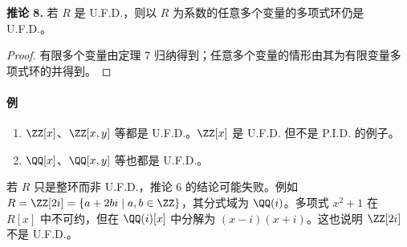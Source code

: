 \noindent\textbf{推论 8.} 若 $R$ 是 U.F.D.，则以 $R$ 为系数的任意多个变量的多项式环仍是 U.F.D.。

\begin{proof}
	有限多个变量由定理 7 归纳得到；任意多个变量的情形由其为有限变量多项式环的并得到。
\end{proof}

\paragraph{例}
\begin{enumerate}[label=(\arabic*)]
	\item $\ZZ[x]$、$\ZZ[x,y]$ 等都是 U.F.D.。$\ZZ[x]$ 是 U.F.D. 但不是 P.I.D. 的例子。
	\item $\QQ[x]$、$\QQ[x,y]$ 等也都是 U.F.D.。
\end{enumerate}

若 $R$ 只是整环而非 U.F.D.，推论 6 的结论可能失败。例如 $R=\ZZ[2i]=\{a+2bi\mid a,b\in\ZZ\}$，其分式域为 $\QQ(i)$。多项式 $x^2+1$ 在 $R[x]$ 中不可约，但在 $\QQ(i)[x]$ 中分解为 $(x-i)(x+i)$。这也说明 $\ZZ[2i]$ 不是 U.F.D.。


